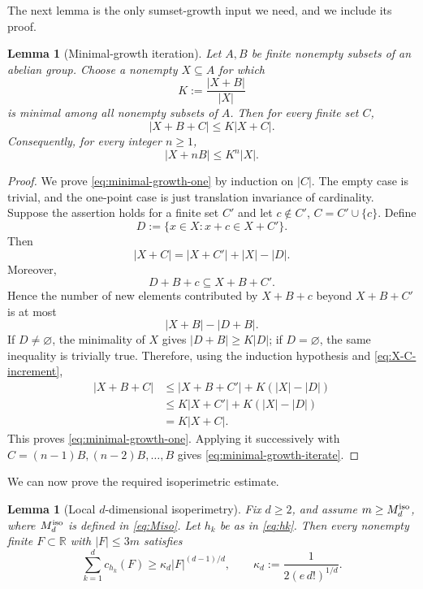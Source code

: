 \documentclass[11pt]{article}
\newtheorem{lemma}[theorem]{Lemma}
\theoremstyle{definition}
\newcommand{\R}{\mathbb{R}}
\newcommand{\1}{\mathbf{1}}
\begin{document}
The next lemma is the only sumset-growth input we need, and we include its proof.

\begin{lemma}[Minimal-growth iteration]\label{lem:minimal-growth}
Let $A,B$ be finite nonempty subsets of an abelian group.  Choose a nonempty $X\subseteq A$ for which
\[
  K:=\frac{|X+B|}{|X|}
\]
is minimal among all nonempty subsets of $A$.  Then for every finite set $C$,
\begin{equation}\label{eq:minimal-growth-one}
  |X+B+C|\le K|X+C|.
\end{equation}
Consequently, for every integer $n\ge1$,
\begin{equation}\label{eq:minimal-growth-iterate}
  |X+nB|\le K^n|X|.
\end{equation}
\end{lemma}

\begin{proof}
We prove \eqref{eq:minimal-growth-one} by induction on $|C|$.  The empty case is trivial, and the one-point case is just translation invariance of cardinality.  Suppose the assertion holds for a finite set $C'$ and let $c\notin C'$, $C=C'\cup\{c\}$.  Define
\[
  D:=\{x\in X:x+c\in X+C'\}.
\]
Then
\begin{equation}\label{eq:X-C-increment}
  |X+C|=|X+C'|+|X|-|D|.
\end{equation}
Moreover,
\[
  D+B+c\subseteq X+B+C'.
\]
Hence the number of new elements contributed by $X+B+c$ beyond $X+B+C'$ is at most
\[
  |X+B|-|D+B|.
\]
If $D\ne\varnothing$, the minimality of $X$ gives $|D+B|\ge K|D|$; if $D=\varnothing$, the same inequality is trivially true.  Therefore, using the induction hypothesis and \eqref{eq:X-C-increment},
\begin{align*}
  |X+B+C|
  &\le |X+B+C'|+K(|X|-|D|)\\
  &\le K|X+C'|+K(|X|-|D|)\\
  &=K|X+C|.
\end{align*}
This proves \eqref{eq:minimal-growth-one}.  Applying it successively with $C=(n-1)B,(n-2)B,\ldots,B$ gives \eqref{eq:minimal-growth-iterate}.
\end{proof}

We can now prove the required isoperimetric estimate.

\begin{lemma}[Local $d$-dimensional isoperimetry]\label{lem:isoperimetry}
Fix $d\ge2$, and assume $m\ge M_d^{\rm iso}$, where $M_d^{\rm iso}$ is defined in \eqref{eq:Miso}.  Let $h_k$ be as in \eqref{eq:hk}.  Then every nonempty finite $F\subset\R$ with $|F|\le3m$ satisfies
\begin{equation}\label{eq:isoperimetry}
  \sum_{k=1}^d c_{h_k}(F)
  \ge \kappa_d |F|^{(d-1)/d},
  \qquad
  \kappa_d:=\frac1{2(e\,d!)^{1/d}}.
\end{equation}
\end{lemma}
\end{document}

